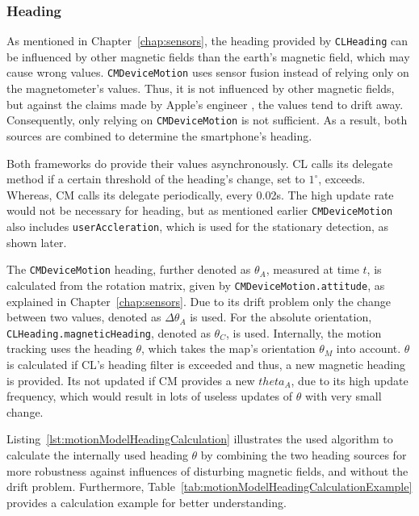 \subsubsection*{Heading}
As mentioned in Chapter~\ref{chap:sensors}, the heading provided by \texttt{CLHeading} can be influenced by other magnetic fields than the earth's magnetic field, which may cause wrong values. \texttt{CMDeviceMotion} uses sensor fusion instead of relying only on the magnetometer's values. Thus, it is not influenced by other magnetic fields, but against the claims made by Apple's engineer \citet{apple:wwdc_2012_pham}, the values tend to drift away. Consequently, only relying on \texttt{CMDeviceMotion} is not sufficient. As a result, both sources are combined to determine the smartphone's heading.

Both frameworks do provide their values asynchronously. \acs{CL} calls its delegate method if a certain threshold of the heading's change, set to $1^\circ$, exceeds. Whereas, \acs{CM} calls its delegate periodically, every 0.02s. The high update rate would not be necessary for heading, but as mentioned earlier \texttt{CMDeviceMotion} also includes \texttt{userAccleration}, which is used for the stationary detection, as shown later.

The \texttt{CMDeviceMotion} heading, further denoted as $\theta_A$, measured at time $t$, is calculated from the rotation matrix, given by \texttt{CMDeviceMotion.attitude}, as explained in Chapter~\ref{chap:sensors}. Due to its drift problem only the change between two values, denoted as $\Delta\theta_A$ is used. For the absolute orientation, \texttt{CLHeading.magneticHeading}, denoted as $\theta_C$, is used. Internally, the motion tracking uses the heading $\theta$, which takes the map's orientation $\theta_M$ into account. $\theta$ is calculated if \acs{CL}'s heading filter is exceeded and thus, a new magnetic heading is provided. Its not updated if \acs{CM} provides a new $theta_A$, due to its high update frequency, which would result in lots of useless updates of $\theta$ with very small change.

Listing~\ref{lst:motionModelHeadingCalculation} illustrates the used algorithm to calculate the internally used heading $\theta$ by combining the two heading sources for more robustness against influences of disturbing magnetic fields, and without the drift problem. Furthermore, Table~\ref{tab:motionModelHeadingCalculationExample} provides a calculation example for better understanding.



